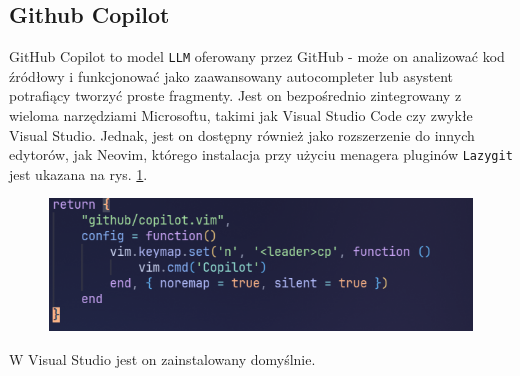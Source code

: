 \subsection{Github Copilot}

GitHub Copilot\cite{copilotsite} to model \texttt{LLM} oferowany przez GitHub - może on analizować kod źródłowy i funkcjonować jako zaawansowany autocompleter lub asystent potrafiący tworzyć proste fragmenty. Jest on bezpośrednio zintegrowany z wieloma narzędziami Microsoftu, takimi jak Visual Studio Code czy zwykłe Visual Studio. Jednak, jest on dostępny również jako rozszerzenie do innych edytorów, jak Neovim, którego instalacja przy użyciu menagera pluginów \texttt{Lazygit} jest ukazana na rys. \ref{fig:copilot_install}.

\begin{figure}[H]
	\centering
	\includegraphics[width=1\textwidth]{images/copilot-plugin.png}
	\caption{}
	\label{fig:copilot_install}
\end{figure}

W Visual Studio jest on zainstalowany domyślnie.
